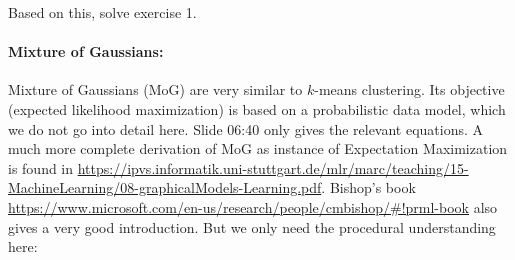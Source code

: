Based on this, solve exercise 1.




\paragraph{Mixture of Gaussians:} Mixture of Gaussians (MoG) are very similar to $k$-means clustering. Its objective (expected likelihood maximization) is based on a probabilistic data model, which we do not go into detail here. Slide 06:40 only gives the relevant equations. A much more complete derivation of MoG as instance of Expectation Maximization is found in \url{https://ipvs.informatik.uni-stuttgart.de/mlr/marc/teaching/15-MachineLearning/08-graphicalModels-Learning.pdf}. Bishop's book \url{https://www.microsoft.com/en-us/research/people/cmbishop/#!prml-book} also gives a very good introduction. But we only need the procedural understanding here:
